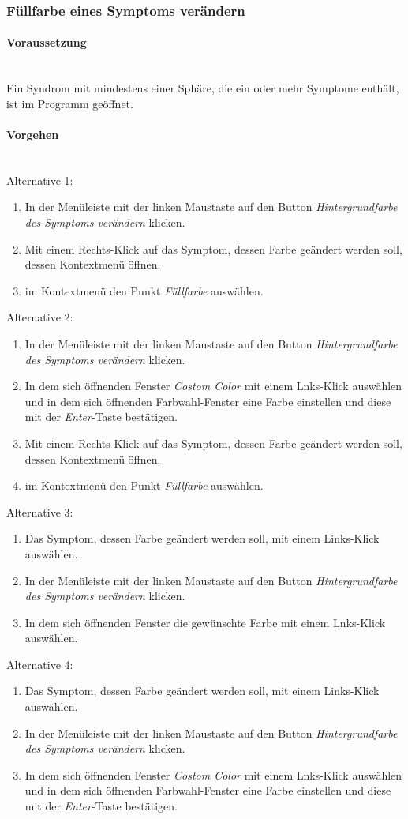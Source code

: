 \documentclass[enabledeprecatedfontcommands,fontsize=11pt,paper=a4,twoside]{scrartcl}
\newcommand*{\condition}{\paragraph{Voraussetzung}$\;$ \vspace{0.2cm}\\}
\newcommand*{\actions}{\paragraph{Vorgehen} $\;$\vspace{0.2cm}\\}
\begin{document}
		\subsubsection{Füllfarbe eines Symptoms verändern}
		\condition 	
		Ein Syndrom mit mindestens einer Sphäre, die ein oder mehr Symptome enthält, ist im Programm geöffnet. 
		\actions
		Alternative 1:
		\begin{enumerate}
			\item In der Menüleiste mit der linken Maustaste auf den Button \textit{Hintergrundfarbe des Symptoms verändern} klicken.
			\item Mit einem Rechts-Klick auf das Symptom, dessen Farbe geändert werden soll, dessen Kontextmenü öffnen.
			\item im Kontextmenü den Punkt \textit{Füllfarbe} auswählen.
		\end{enumerate}
		Alternative 2:
		\begin{enumerate}
			\item In der Menüleiste mit der linken Maustaste auf den Button \textit{Hintergrundfarbe des Symptoms verändern} klicken.
			\item In dem sich öffnenden Fenster \textit{Costom Color} mit einem Lnks-Klick auswählen und in dem sich öffnenden Farbwahl-Fenster eine Farbe einstellen und diese mit der \textit{Enter}-Taste bestätigen.
			 \item Mit einem Rechts-Klick auf das Symptom, dessen Farbe geändert werden soll, dessen Kontextmenü öffnen.
			\item im Kontextmenü den Punkt \textit{Füllfarbe} auswählen.
		\end{enumerate}
		Alternative 3:
		\begin{enumerate}
			\item Das Symptom, dessen Farbe geändert werden soll, mit einem Links-Klick auswählen.
			\item In der Menüleiste mit der linken Maustaste auf den Button \textit{Hintergrundfarbe des Symptoms verändern} klicken.
			\item In dem sich öffnenden Fenster die gewünschte Farbe mit einem Lnks-Klick auswählen.
		\end{enumerate}
		Alternative 4:
			\begin{enumerate}
			\item Das Symptom, dessen Farbe geändert werden soll, mit einem Links-Klick auswählen.
			\item In der Menüleiste mit der linken Maustaste auf den Button \textit{Hintergrundfarbe des Symptoms verändern} klicken.
			\item In dem sich öffnenden Fenster \textit{Costom Color} mit einem Lnks-Klick auswählen und in dem sich öffnenden Farbwahl-Fenster eine Farbe einstellen und diese mit der \textit{Enter}-Taste bestätigen.
		\end{enumerate}
\end{document}
